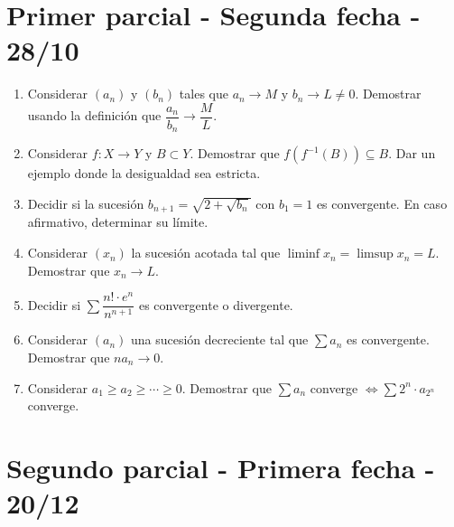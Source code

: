 \section{Primer parcial - Segunda fecha - 28/10}

\begin{enumerate}
  \item Considerar \((a_n)\) y \((b_n)\) tales que \(a_n \to M\) y \(b_n \to L \neq 0\). Demostrar usando la definición que \(\dfrac{a_n}{b_n} \to \dfrac{M}{L}\).
  \item Considerar \(f: X \to Y\) y \(B \subset Y\). Demostrar que \(f(f^{-1}(B)) \subseteq B\). Dar un ejemplo donde la desigualdad sea estricta.
  \item Decidir si la sucesión \(b_{n+1} = \sqrt{2 + \sqrt{b_n}}\) con \(b_1 = 1\) es convergente. En caso afirmativo, determinar su límite.
  \item Considerar \((x_n)\) la sucesión acotada tal que \(\liminf x_n = \limsup x_n = L\). Demostrar que \(x_n \to L\).
  \item Decidir si \(\sum \dfrac{n! \cdot e^n}{n^{n+1}}\) es convergente o divergente.
  \item Considerar \((a_n)\) una sucesión decreciente tal que \(\sum a_n\) es convergente. Demostrar que \(n a_n \to 0\).
  \item Considerar \(a_1 \geq a_2 \geq \cdots \geq 0\). Demostrar que \(\sum a_n\) converge \(\iff \sum 2^n \cdot a_{2^n}\) converge.
\end{enumerate}

\clearpage

\section{Segundo parcial - Primera fecha - 20/12}

